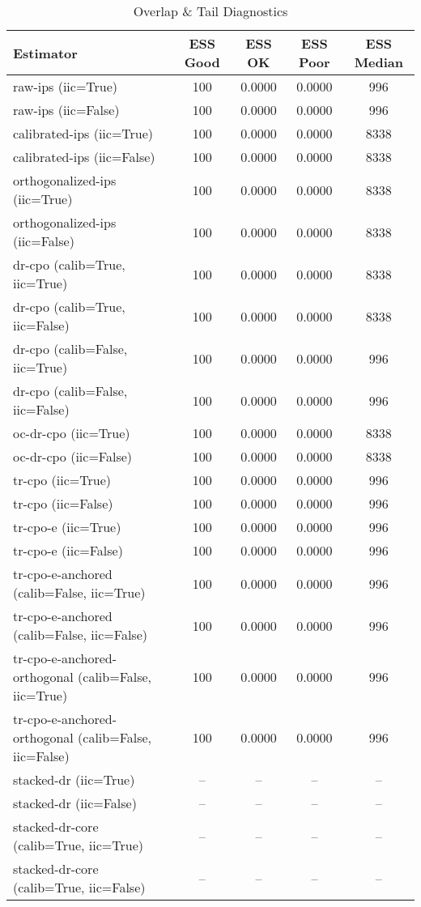 \begin{table}[htbp]
\centering
\caption{Overlap & Tail Diagnostics}
\label{tab:A3}
\begin{tabular}{l|cccc}
\toprule
Estimator & ESS Good & ESS OK & ESS Poor & ESS Median \\
\midrule
raw-ips (iic=True) & 100 & 0.0000 & 0.0000 & 996 \\
raw-ips (iic=False) & 100 & 0.0000 & 0.0000 & 996 \\
calibrated-ips (iic=True) & 100 & 0.0000 & 0.0000 & 8338 \\
calibrated-ips (iic=False) & 100 & 0.0000 & 0.0000 & 8338 \\
orthogonalized-ips (iic=True) & 100 & 0.0000 & 0.0000 & 8338 \\
orthogonalized-ips (iic=False) & 100 & 0.0000 & 0.0000 & 8338 \\
dr-cpo (calib=True, iic=True) & 100 & 0.0000 & 0.0000 & 8338 \\
dr-cpo (calib=True, iic=False) & 100 & 0.0000 & 0.0000 & 8338 \\
dr-cpo (calib=False, iic=True) & 100 & 0.0000 & 0.0000 & 996 \\
dr-cpo (calib=False, iic=False) & 100 & 0.0000 & 0.0000 & 996 \\
oc-dr-cpo (iic=True) & 100 & 0.0000 & 0.0000 & 8338 \\
oc-dr-cpo (iic=False) & 100 & 0.0000 & 0.0000 & 8338 \\
tr-cpo (iic=True) & 100 & 0.0000 & 0.0000 & 996 \\
tr-cpo (iic=False) & 100 & 0.0000 & 0.0000 & 996 \\
tr-cpo-e (iic=True) & 100 & 0.0000 & 0.0000 & 996 \\
tr-cpo-e (iic=False) & 100 & 0.0000 & 0.0000 & 996 \\
tr-cpo-e-anchored (calib=False, iic=True) & 100 & 0.0000 & 0.0000 & 996 \\
tr-cpo-e-anchored (calib=False, iic=False) & 100 & 0.0000 & 0.0000 & 996 \\
tr-cpo-e-anchored-orthogonal (calib=False, iic=True) & 100 & 0.0000 & 0.0000 & 996 \\
tr-cpo-e-anchored-orthogonal (calib=False, iic=False) & 100 & 0.0000 & 0.0000 & 996 \\
stacked-dr (iic=True) & -- & -- & -- & -- \\
stacked-dr (iic=False) & -- & -- & -- & -- \\
stacked-dr-core (calib=True, iic=True) & -- & -- & -- & -- \\
stacked-dr-core (calib=True, iic=False) & -- & -- & -- & -- \\
\bottomrule
\end{tabular}
\end{table}
